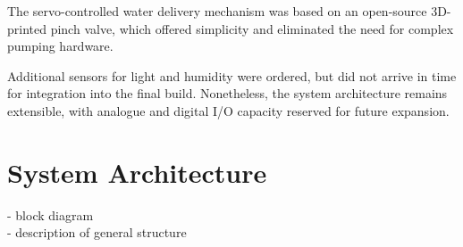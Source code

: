 \documentclass[a4paper,11pt]{article}
\begin{document}
The servo-controlled water delivery mechanism was based on 
an open-source 3D-printed pinch valve, 
which offered simplicity and eliminated 
the need for complex pumping hardware. 

Additional sensors for light and humidity were ordered, 
but did not arrive in time for integration into the final build. 
Nonetheless, the system architecture remains extensible, 
with analogue and digital I/O capacity reserved for future expansion.

\begin{table}[H]
    \centering
    \renewcommand{\arraystretch}{1.5} 
    \caption{Component Order Summary}
    \label{tab:component_order}
\end{table}

\section{System Architecture}
\label{sec:System_Architecture}

- block diagram\\
- description of general structure
\end{document}
